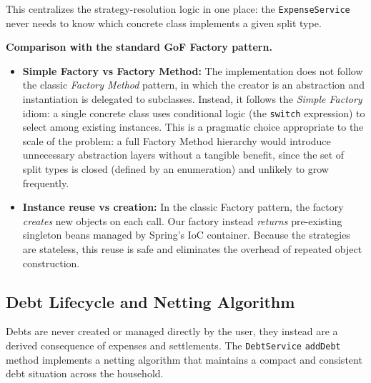 This centralizes the strategy-resolution logic in one place: the \texttt{ExpenseService} never needs to know which concrete class implements a given split type.

\textbf{Comparison with the standard GoF Factory pattern.}
\begin{itemize}
    \item \textbf{Simple Factory vs Factory Method:} The implementation does not follow the classic \textit{Factory Method} pattern, in which the creator is an abstraction and instantiation is delegated to subclasses. Instead, it follows the \textit{Simple Factory} idiom: a single concrete class uses conditional logic (the \texttt{switch} expression) to select among existing instances. This is a pragmatic choice appropriate to the scale of the problem: a full Factory Method hierarchy would introduce unnecessary abstraction layers without a tangible benefit, since the set of split types is closed (defined by an enumeration) and unlikely to grow frequently.
    \item \textbf{Instance reuse vs creation:} In the classic Factory pattern, the factory \textit{creates} new objects on each call. Our factory instead \textit{returns} pre-existing singleton beans managed by Spring's IoC container. Because the strategies are stateless, this reuse is safe and eliminates the overhead of repeated object construction.
\end{itemize}

\subsection{Debt Lifecycle and Netting Algorithm}
\label{sec:debt-lifecycle}
Debts are never created or managed directly by the user, they instead are a derived consequence of expenses and settlements. The \texttt{DebtService} \texttt{addDebt} method implements a netting algorithm that maintains a compact and consistent debt situation across the household.

